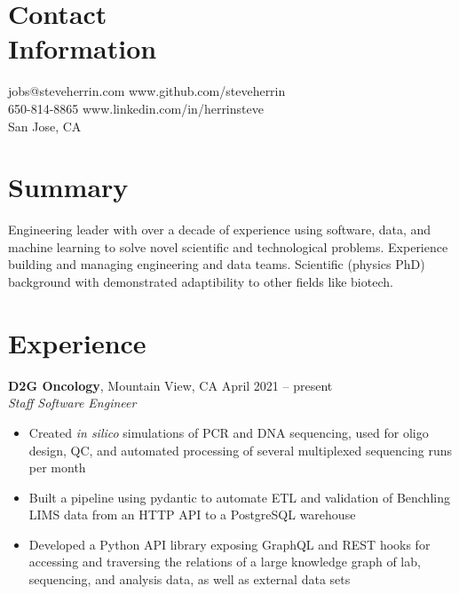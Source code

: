\documentclass[margin,line]{resume}
\begin{document}
\begin{resume}

    \section{\mysidestyle Contact\\Information}

    jobs@steveherrin.com		\hfill www.github.com/steveherrin		\vspace{0mm}\\\vspace{0mm}%
    650-814-8865				\hfill www.linkedin.com/in/herrinsteve		\vspace{0mm}\\\vspace{-4.5mm}%
    San Jose, CA    				\hfill		\vspace{0mm}\\\vspace{0mm}%

    \section{\mysidestyle Summary}
    Engineering leader with over a decade of experience using software, data, and machine learning to solve novel scientific and technological problems. Experience building and managing engineering and data teams. Scientific (physics PhD) background with demonstrated adaptibility to other fields like biotech.%
    \section{\mysidestyle Experience}
    \textbf{D2G Oncology}, Mountain View, CA \hfill\vspace{1mm}\hfill April 2021 -- present\\%
    \textsl{Staff Software Engineer}
    \begin{itemize}
    \item Created \textit{in silico} simulations of PCR and DNA sequencing, used for oligo design, QC, and automated processing of several multiplexed sequencing runs per month
    \item Built a pipeline using pydantic to automate ETL and validation of Benchling LIMS data from an HTTP API to a PostgreSQL warehouse
    \item Developed a Python API library exposing GraphQL and REST hooks for accessing and traversing the relations of a large knowledge graph of lab, sequencing, and analysis data, as well as external data sets
    \end{itemize}


\end{resume}
\end{document}
